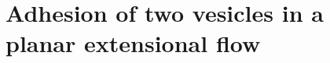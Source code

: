 \documentclass[prf,superscriptaddress,showkeys]{revtex4-1}
\begin{document}
%
%
%
%
%

\section{Adhesion of two vesicles in a planar extensional flow} 
\label{sec:eflow} 
\end{document}
